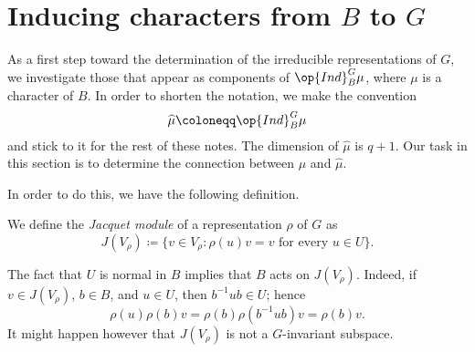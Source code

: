 \documentclass[../main.tex]{subfiles}
\begin{document}
\section{Inducing characters from \texorpdfstring{$B$}{ B} to \texorpdfstring{$G$}{ G}}
As a first step toward the determination of the irreducible representations of $G$, we investigate those that appear as components of $\op{Ind}^G_B\mu$, where $\mu$ is a character of $B$. In order to shorten the notation, we make the convention
\[\widehat\mu\coloneqq\op{Ind}^G_B\mu\]
and stick to it for the rest of these notes. The dimension of $\widehat\mu$ is $q+1$. Our task in this section is to determine the connection between $\mu$ and $\widehat\mu$.

In order to do this, we have the following definition.
\begin{definition}
	We define the \textit{Jacquet module} of a representation $\rho$ of $G$ as
	\[J(V_\rho)\coloneqq\{v\in V_\rho:\rho(u)v=v\text{ for every }u\in U\}.\]
\end{definition}
The fact that $U$ is normal in $B$ implies that $B$ acts on $J(V_\rho)$. Indeed, if $v\in J(V_\rho)$, $b\in B$, and $u\in U$, then $b^{-1}ub\in U$; hence
\[\rho(u)\rho(b)v=\rho(b)\rho\left(b^{-1}ub\right)v=\rho(b)v.\]
It might happen however that $J(V_\rho)$ is not a $G$-invariant subspace.
\end{document}
